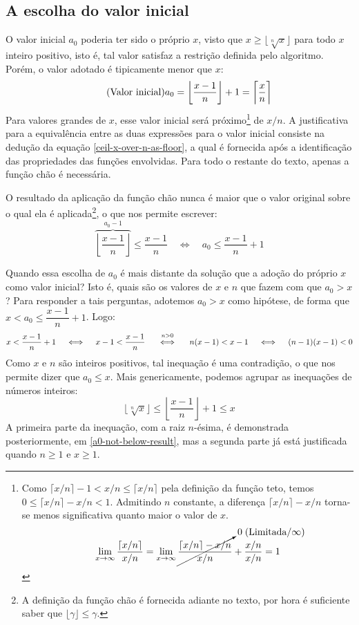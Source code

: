 \subsection*{A escolha do valor inicial}

O valor inicial $a_0$ poderia ter sido o próprio $x$,
visto que $x \ge \lfloor \sqrt[n]{x} \rfloor$
para todo $x$ inteiro positivo,
isto é, tal valor satisfaz a restrição definida pelo algoritmo.
Porém, o valor adotado é tipicamente menor que $x$:
\[\tag{Valor inicial}
  a_0 = \left\lfloor \dfrac{x - 1}{n} \right\rfloor + 1
      = \left\lceil \dfrac{x\vphantom{l}}{n} \right\rceil
\]
Para valores grandes de $x$, esse valor inicial será próximo\footnote{
  Como $\lceil x/n \rceil - 1 < x/n \le \lceil x/n \rceil$
  pela definição da função teto,
  temos $0 \le \lceil x/n \rceil - x/n < 1$.
  Admitindo $n$ constante, a diferença $\lceil x/n \rceil - x/n$
  torna-se menos significativa quanto maior o valor de $x$.
  \[
    \lim_{x\to\infty} \dfrac{\lceil x/n \rceil}{x/n}
    =
    \lim_{x\to\infty} \cancelto{0\;(\text{Limitada}/\infty)}{
                        \dfrac{\lceil x/n \rceil - x/n}{x/n}
                      } +
                      \dfrac{x/n}{x/n}
    = 1
  \]
}
de $x/n$.
A justificativa para a equivalência
entre as duas expressões para o valor inicial
consiste na dedução da equação \eqref{ceil-x-over-n-as-floor}, a qual
é fornecida após a identificação das propriedades
das funções envolvidas.
Para todo o restante do texto, apenas a função chão é necessária.

O resultado da aplicação da função chão
nunca é maior que o valor original
sobre o qual ela é aplicada\footnote{
  A definição da função chão é fornecida adiante no texto,
  por hora é suficiente saber que $\lfloor \gamma \rfloor \le \gamma$.
},
o que nos permite escrever:
\[
  \overbrace{\left\lfloor \dfrac{x - 1}{n} \right\rfloor}^{a_0 - 1}
  \le \dfrac{x - 1}{n}
  \quad\iff\quad
  a_0 \le \dfrac{x - 1}{n} + 1
\]

Quando essa escolha de $a_0$
é mais distante da solução
que a adoção do próprio $x$ como valor inicial?
Isto é, quais são os valores de $x$ e $n$
que fazem com que $a_0 > x$?
Para responder a tais perguntas,
adotemos $a_0 > x$ como hipótese,
de forma que $x < a_0 \le \dfrac{x - 1}{n} + 1$.
Logo:
\[
  x < \dfrac{x - 1}{n} + 1
  \quad\iff\quad
  x - 1 < \dfrac{x - 1}{n}
  \quad\stackfirst{n > 0}{\iff}\quad
  n(x - 1) < x - 1
  \quad\iff\quad
  (n - 1)(x - 1) < 0
\]
Como $x$ e $n$ são inteiros positivos,
tal inequação é uma contradição,
o que nos permite dizer que $a_0 \le x$.
Mais genericamente,
podemos agrupar as inequações de números inteiros:
\begin{equation}\label{a0-between-result-and-x}
  \lfloor \sqrt[n]{x} \rfloor
  \le
  \left\lfloor \dfrac{x - 1}{n} \right\rfloor + 1
  \le
  x
\end{equation}
A primeira parte da inequação, com a raiz $n$-ésima,
é demonstrada posteriormente, em \eqref{a0-not-below-result},
mas a segunda parte já está justificada quando $n \ge 1$ e $x \ge 1$.
